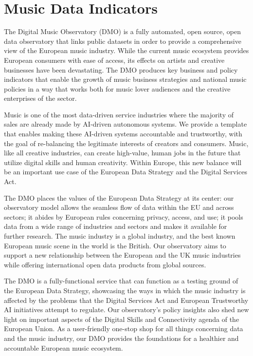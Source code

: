 \documentclass[
  a4paper,
  openany, a4paper, oneside]{book}
\begin{document}
\hypertarget{music-data}{%
\chapter{Music Data Indicators}\label{music-data}}

The Digital Music Observatory (DMO) is a fully automated, open source, open data observatory that links public datasets in order to provide a comprehensive view of the European music industry. While the current music ecosystem provides European consumers with ease of access, its effects on artists and creative businesses have been devastating. The DMO produces key business and policy indicators that enable the growth of music business strategies and national music policies in a way that works both for music lover audiences and the creative enterprises of the sector.

Music is one of the most data-driven service industries where the majority of sales are already made by AI-driven autonomous systems. We provide a template that enables making these AI-driven systems accountable and trustworthy, with the goal of re-balancing the legitimate interests of creators and consumers. Music, like all creative industries, can create high-value, human jobs in the future that utilize digital skills and human creativity. Within Europe, this new balance will be an important use case of the European Data Strategy and the Digital Services Act.

The DMO places the values of the European Data Strategy at its center: our observatory model allows the seamless flow of data within the EU and across sectors; it abides by European rules concerning privacy, access, and use; it pools data from a wide range of industries and sectors and makes it available for further research. The music industry is a global industry, and the best known European music scene in the world is the British. Our observatory aims to support a new relationship between the European and the UK music industries while offering international open data products from global sources.

The DMO is a fully-functional service that can function as a testing ground of the European Data Strategy, showcasing the ways in which the music industry is affected by the problems that the Digital Services Act and European Trustworthy AI initiatives attempt to regulate. Our observatory's policy insights also shed new light on important aspects of the Digital Skills and Connectivity agenda of the European Union. As a user-friendly one-stop shop for all things concerning data and the music industry, our DMO provides the foundations for a healthier and accountable European music ecosystem.
\end{document}
